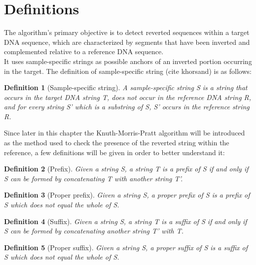 \newtheorem{definition}{Definition}
\newtheorem{example}{Example}

\section{Definitions}
The algorithm's primary objective is to detect reverted sequences within a target DNA sequence, which are characterized by segments that have been inverted and complemented relative to a reference DNA sequence. \\
It uses sample-specific strings as possible anchors of an inverted portion occurring in the target. The definition of sample-specific string (cite khorsand) is as follows:

\begin{definition}[Sample-specific string]
A sample-specific string S is a string that occurs in the target DNA string T, does not occur in the reference DNA string R, and for every string S' which is a substring of S, S' occurs in the reference string R. 
\label{thm:sample_specific}
\end{definition} 

Since later in this chapter the Knuth-Morris-Pratt algorithm will be introduced as the method used to check the presence of the reverted string within the reference, a few definitions will be given \cite{noauthor_definitionprefix_nodate} in order to better understand it:

\begin{definition}[Prefix]
Given a string S, a string T is a prefix of S if and only if S can be formed by concatenating T with another string T'.
\label{thm:prefix}
\end{definition}

\begin{definition}[Proper prefix]
Given a string S, a proper prefix of S is a prefix of S which does not equal the whole of S.
\label{thm:proprefix}
\end{definition}

\begin{definition}[Suffix]
Given a string S, a string T is a suffix of S if and only if S can be formed by concatenating another string T' with T.
\label{thm:suffix}
\end{definition}

\begin{definition}[Proper suffix]
Given a string S, a proper suffix of S is a suffix of S which does not equal the whole of S.
\label{thm:prosuffix}
\end{definition}

